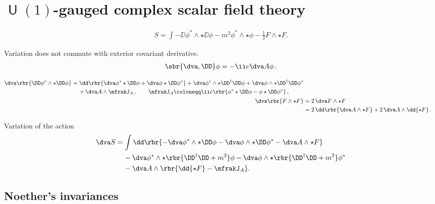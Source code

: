 \documentclass[a4paper]{article}
\begin{document}
\section[$U(1)$-gauged complex scalar field theory]%
{$\msansU(1)$-gauged complex scalar field theory}

\begin{align}
S = \int -\DD\phi^*\wedge\star\DD\phi - m^2 \phi^*\wedge\star\phi
	-\frac{1}{2} F \wedge \star F.
\end{align}

Variation does not commute with exterior covariant derivative.
\begin{align}
\sbr{\dva, \DD}\phi = -\ii e \dva A\phi\,.
\end{align}

\begin{align}
\begin{split}
\dva \rbr{\DD \phi^*\wedge\star\DD\phi} &= 
\dd\rbr{\dva\phi^* \star\DD\phi + \dva\phi \star\DD\phi^*} +
	\dva\phi^*\wedge\star\DD^{\dagger}\DD\phi +
	\dva\phi\wedge\star\DD^{\dagger}\DD\phi^*
\\ &\quad\,+
\dva A \wedge \mfrakJ_A \,,
\qquad
\mfrakJ_A \coloneqq 
	\ii e \rbr{\phi^* \star\DD\phi - \phi\star\DD\phi^*}\,,
\end{split}
\\
\dva \rbr{F\wedge\star F} &=
	2\,\dva F \wedge \star F
\\ &=
	2\,\dd\rbr{\dva A \wedge \star F} + 2\,\dva A \wedge \dd {\star F}\,.
\end{align}

Variation of the action
\begin{align}
\dva S &=
\int \dd\rbr{-\dva\phi^*\wedge\star\DD\phi -
\dva\phi\wedge\star\DD\phi^* - \dva A \wedge\star F}
\nonumber \\
&\quad\,-
\dva\phi^*\wedge\star\rbr{\DD^{\dagger}\DD + m^2}\phi -
\dva\phi\wedge\star\rbr{\DD^{\dagger}\DD + m^2}\phi^*
\nonumber \\
&\quad\,-
\dva A\wedge\rbr{\dd{\star F} - \mfrakJ_{A}}.
\end{align}


\subsection{Noether's invariances}
\end{document}
